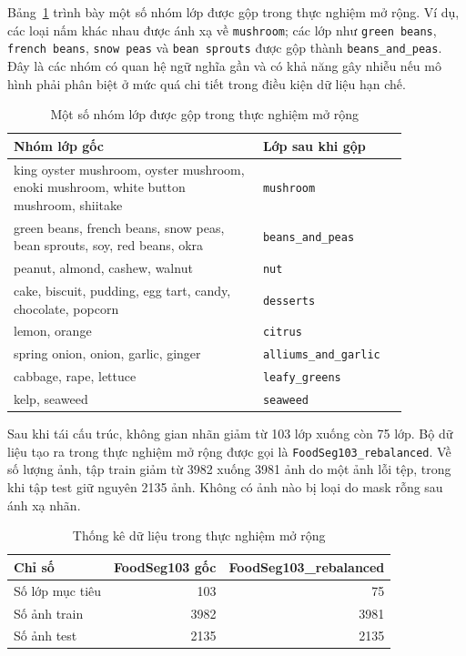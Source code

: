 Bảng~\ref{tab:merge_groups} trình bày một số nhóm lớp được gộp trong thực nghiệm mở rộng. Ví dụ, các loại nấm khác nhau được ánh xạ về \texttt{mushroom}; các lớp như \texttt{green beans}, \texttt{french beans}, \texttt{snow peas} và \texttt{bean sprouts} được gộp thành \texttt{beans\_and\_peas}. Đây là các nhóm có quan hệ ngữ nghĩa gần và có khả năng gây nhiễu nếu mô hình phải phân biệt ở mức quá chi tiết trong điều kiện dữ liệu hạn chế.

\begin{table}[H]
\centering
\caption{Một số nhóm lớp được gộp trong thực nghiệm mở rộng}
\label{tab:merge_groups}
\begin{tabular}{p{0.56\linewidth}p{0.30\linewidth}}
\toprule
\textbf{Nhóm lớp gốc} & \textbf{Lớp sau khi gộp} \\
\midrule
king oyster mushroom, oyster mushroom, enoki mushroom, white button mushroom, shiitake 
& \texttt{mushroom} \\
\midrule
green beans, french beans, snow peas, bean sprouts, soy, red beans, okra 
& \texttt{beans\_and\_peas} \\
\midrule
peanut, almond, cashew, walnut 
& \texttt{nut} \\
\midrule
cake, biscuit, pudding, egg tart, candy, chocolate, popcorn 
& \texttt{desserts} \\
\midrule
lemon, orange 
& \texttt{citrus} \\
\midrule
spring onion, onion, garlic, ginger 
& \texttt{alliums\_and\_garlic} \\
\midrule
cabbage, rape, lettuce 
& \texttt{leafy\_greens} \\
\midrule
kelp, seaweed
& \texttt{seaweed} \\
\bottomrule
\end{tabular}
\end{table}

Sau khi tái cấu trúc, không gian nhãn giảm từ 103 lớp xuống còn 75 lớp. Bộ dữ liệu tạo ra trong thực nghiệm mở rộng được gọi là \texttt{FoodSeg103\_rebalanced}. Về số lượng ảnh, tập train giảm từ 3982 xuống 3981 ảnh do một ảnh lỗi tệp, trong khi tập test giữ nguyên 2135 ảnh. Không có ảnh nào bị loại do mask rỗng sau ánh xạ nhãn.

\begin{table}[H]
    \centering
    \caption{Thống kê dữ liệu trong thực nghiệm mở rộng}
    \label{tab:data_before_after}
    \begin{tabular}{lrr}
        \toprule
        \textbf{Chỉ số} & \textbf{FoodSeg103 gốc} & \textbf{FoodSeg103\_rebalanced} \\
        \midrule
        Số lớp mục tiêu & 103 & 75 \\
        Số ảnh train & 3982 & 3981 \\
        Số ảnh test & 2135 & 2135 \\
        \bottomrule
    \end{tabular}
\end{table}

